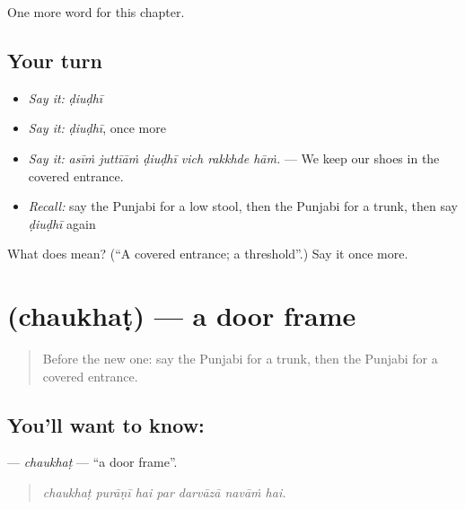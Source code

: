 \begin{grammarlens}[title={What you've built}]
One more word for this chapter.
\end{grammarlens}

\subsection*{Your turn}
\begin{itemize}
\raggedright
  \item \emph{Say it:} \emph{ḍiuḍhī}
  \item \emph{Say it:} \emph{ḍiuḍhī}, once more
  \item \emph{Say it:} \emph{asīṁ juttīāṁ ḍiuḍhī vich rakkhde hāṁ.} — We keep our shoes in the covered entrance.
  \item \emph{Recall:} say the Punjabi for a low stool, then the Punjabi for a trunk, then say \emph{ḍiuḍhī} again
\end{itemize}

\begin{tcolorbox}[breakable,colback=teal!4,colframe=teal!35!black,title={Before you move on}]
What does  mean? (\textquotedblleft{}A covered entrance; a threshold\textquotedblright{}.) Say it once more.
\end{tcolorbox}
\section[\texorpdfstring{\pa{ਚੌਖਟ} (chaukhaṭ)}{ਚੌਖਟ (chaukhaṭ)}]{ (chaukhaṭ) — a door frame}

\label{lesson:PA-C248-chaukhat}



\begin{quote}
Before the new one: say the Punjabi for a trunk, then the Punjabi for a covered entrance.
\end{quote}

\subsection*{You'll want to know: }
\textbf{} — \emph{chaukhaṭ} — \textquotedblleft{}a door frame\textquotedblright{}.

\begin{quote}
      
\end{quote}

\begin{quote}
\emph{chaukhaṭ purāṇī hai par darvāzā navāṁ hai.}
\end{quote}

